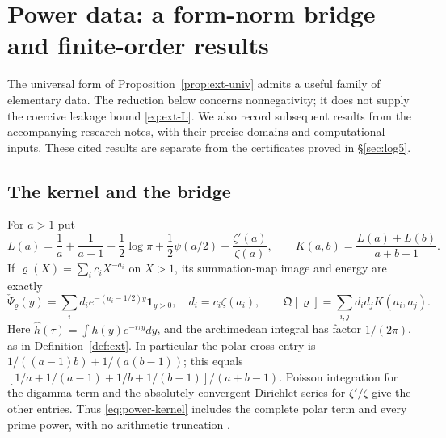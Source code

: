 \documentclass[11pt]{amsart}
\theoremstyle{definition}
\theoremstyle{remark}
\begin{document}
\section{Power data: a form-norm bridge and finite-order results}\label{sec:power}

The universal form of Proposition~\ref{prop:ext-univ} admits a useful family of elementary data.
The reduction below concerns nonnegativity; it does not supply the coercive leakage bound
\eqref{eq:ext-L}. We also record subsequent results from the accompanying research notes, with their
precise domains and computational inputs. These cited results are separate from the certificates
proved in \S\ref{sec:log5}.

\subsection{The kernel and the bridge}\label{subsec:power-bridge}
For $a>1$ put
\[
 L(a)=\frac1a+\frac1{a-1}-\frac12\log\pi+
       \frac12\psi(a/2)+\frac{\zeta'(a)}{\zeta(a)},\qquad
 K(a,b)=\frac{L(a)+L(b)}{a+b-1}.
\]
If $\varrho(X)=\sum_i c_iX^{-a_i}$ on $X>1$, its summation-map image and energy are exactly
\begin{equation}\label{eq:power-kernel}
 \check\Psi_\varrho(y)=\sum_i d_i e^{-(a_i-1/2)y}\mathbf1_{y>0},\quad
 d_i=c_i\zeta(a_i),\qquad
 \mathfrak Q[\varrho]=\sum_{i,j}d_i d_jK(a_i,a_j).
\end{equation}
Here $\widehat h(\tau)=\int h(y)e^{-i\tau y}dy$, and the archimedean integral has factor $1/(2\pi)$,
as in Definition~\ref{def:ext}. In particular the polar cross entry is
$1/((a-1)b)+1/(a(b-1))$; this equals
$[1/a+1/(a-1)+1/b+1/(b-1)]/(a+b-1)$. Poisson integration for the digamma term and the absolutely
convergent Dirichlet series for $\zeta'/\zeta$ give the other entries. Thus
\eqref{eq:power-kernel} includes the complete polar term and every prime power, with no arithmetic truncation
\cite[\S1]{PowerCone}.
\end{document}

